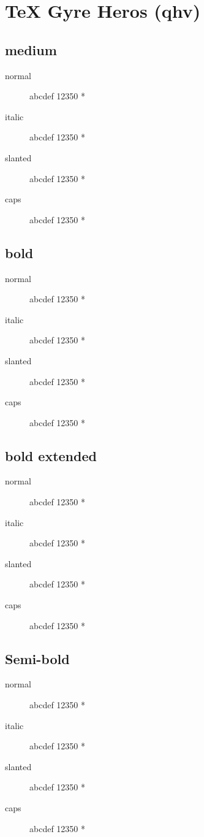 \section{\TeX{} Gyre Heros (qhv)}

\subsection{medium}
\begin{description}
    \item [normal]  abcdef 12350 *
    \item [italic]  abcdef 12350 *
    \item [slanted]  abcdef 12350 *
    \item [caps]  abcdef 12350 *
\end{description}
    
\subsection{bold}
\begin{description}
    \item [normal]  abcdef 12350 *
    \item [italic]  abcdef 12350 *
    \item [slanted]  abcdef 12350 *
    \item [caps]  abcdef 12350 *
\end{description}
    
\subsection{bold extended}
\begin{description}
    \item [normal]  abcdef 12350 *
    \item [italic]  abcdef 12350 *
    \item [slanted]  abcdef 12350 *
    \item [caps]  abcdef 12350 *
\end{description}

\subsection{Semi-bold}
\begin{description}
    \item [normal]  abcdef 12350 *
    \item [italic]  abcdef 12350 *
    \item [slanted]  abcdef 12350 *
    \item [caps]  abcdef 12350 *
\end{description}

